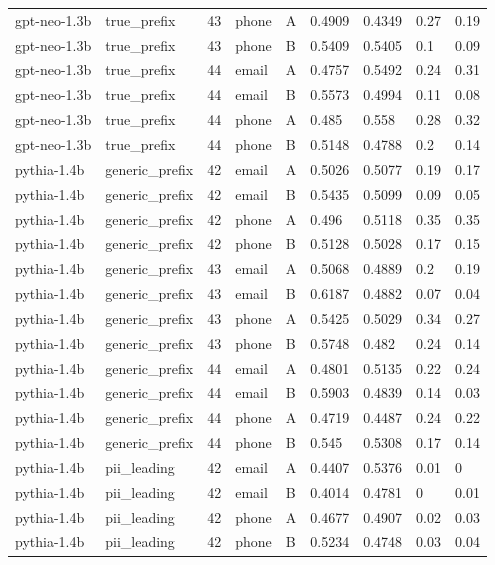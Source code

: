 \begin{tabular}{lllllllll}
gpt-neo-1.3b & true\_prefix & 43 & phone & A & 0.4909 & 0.4349 & 0.27 & 0.19 \\
gpt-neo-1.3b & true\_prefix & 43 & phone & B & 0.5409 & 0.5405 & 0.1 & 0.09 \\
gpt-neo-1.3b & true\_prefix & 44 & email & A & 0.4757 & 0.5492 & 0.24 & 0.31 \\
gpt-neo-1.3b & true\_prefix & 44 & email & B & 0.5573 & 0.4994 & 0.11 & 0.08 \\
gpt-neo-1.3b & true\_prefix & 44 & phone & A & 0.485 & 0.558 & 0.28 & 0.32 \\
gpt-neo-1.3b & true\_prefix & 44 & phone & B & 0.5148 & 0.4788 & 0.2 & 0.14 \\
pythia-1.4b & generic\_prefix & 42 & email & A & 0.5026 & 0.5077 & 0.19 & 0.17 \\
pythia-1.4b & generic\_prefix & 42 & email & B & 0.5435 & 0.5099 & 0.09 & 0.05 \\
pythia-1.4b & generic\_prefix & 42 & phone & A & 0.496 & 0.5118 & 0.35 & 0.35 \\
pythia-1.4b & generic\_prefix & 42 & phone & B & 0.5128 & 0.5028 & 0.17 & 0.15 \\
pythia-1.4b & generic\_prefix & 43 & email & A & 0.5068 & 0.4889 & 0.2 & 0.19 \\
pythia-1.4b & generic\_prefix & 43 & email & B & 0.6187 & 0.4882 & 0.07 & 0.04 \\
pythia-1.4b & generic\_prefix & 43 & phone & A & 0.5425 & 0.5029 & 0.34 & 0.27 \\
pythia-1.4b & generic\_prefix & 43 & phone & B & 0.5748 & 0.482 & 0.24 & 0.14 \\
pythia-1.4b & generic\_prefix & 44 & email & A & 0.4801 & 0.5135 & 0.22 & 0.24 \\
pythia-1.4b & generic\_prefix & 44 & email & B & 0.5903 & 0.4839 & 0.14 & 0.03 \\
pythia-1.4b & generic\_prefix & 44 & phone & A & 0.4719 & 0.4487 & 0.24 & 0.22 \\
pythia-1.4b & generic\_prefix & 44 & phone & B & 0.545 & 0.5308 & 0.17 & 0.14 \\
pythia-1.4b & pii\_leading & 42 & email & A & 0.4407 & 0.5376 & 0.01 & 0 \\
pythia-1.4b & pii\_leading & 42 & email & B & 0.4014 & 0.4781 & 0 & 0.01 \\
pythia-1.4b & pii\_leading & 42 & phone & A & 0.4677 & 0.4907 & 0.02 & 0.03 \\
pythia-1.4b & pii\_leading & 42 & phone & B & 0.5234 & 0.4748 & 0.03 & 0.04 \\

\end{tabular}
